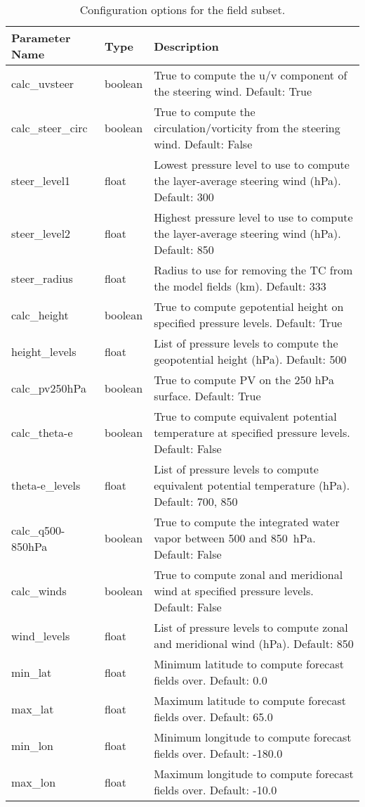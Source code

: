 \documentclass[psfig,12pt]{article}
\begin{document}
\begin{table}[H]
\caption{Configuration options for the field subset.}
\begin{center}
\begin{tabular}{|p{1.60in}|p{0.5in}|p{4.15in}|}
\hline
Parameter Name & Type & Description \\ \hline \hline
calc\_uvsteer & boolean & True to compute the u/v component of the steering wind. Default: True \\ \hline
calc\_steer\_circ & boolean & True to compute the circulation/vorticity from the steering wind.  Default:  False \\ \hline
steer\_level1 & float & Lowest pressure level to use to compute the layer-average steering wind (hPa).  Default: 300 \\ \hline
steer\_level2 & float & Highest pressure level to use to compute the layer-average steering wind (hPa).  Default: 850 \\ \hline
steer\_radius & float & Radius to use for removing the TC from the model fields (km).  Default: 333 \\ \hline
calc\_height & boolean & True to compute gepotential height on specified pressure levels.  Default:  True \\ \hline
height\_levels & float & List of pressure levels to compute the geopotential height (hPa).
Default:  500 \\ \hline
calc\_pv250hPa & boolean & True to compute PV on the 250 hPa surface.  Default:  True \\ \hline
calc\_theta-e & boolean & True to compute equivalent potential temperature at specified pressure levels.
Default:  False \\ \hline
theta-e\_levels & float & List of pressure levels to compute equivalent potential temperature (hPa).
Default:  700, 850 \\ \hline
calc\_q500-850hPa & boolean & True to compute the integrated water vapor between 500 and 
850~hPa.  Default:  False \\ \hline
calc\_winds & boolean & True to compute zonal and meridional wind at specified pressure levels.
Default:  False \\ \hline
wind\_levels & float & List of pressure levels to compute zonal and meridional wind (hPa).
Default:  850 \\ \hline
min\_lat & float & Minimum latitude to compute forecast fields over.  Default:  0.0 \\ \hline
max\_lat & float & Maximum latitude to compute forecast fields over.  Default:  65.0 \\ \hline
min\_lon & float & Minimum longitude to compute forecast fields over.  Default:  -180.0 \\ \hline
max\_lon & float & Maximum longitude to compute forecast fields over.  Default:  -10.0 \\ \hline
\end{tabular}
\end{center}
\end{table}
\end{document}

